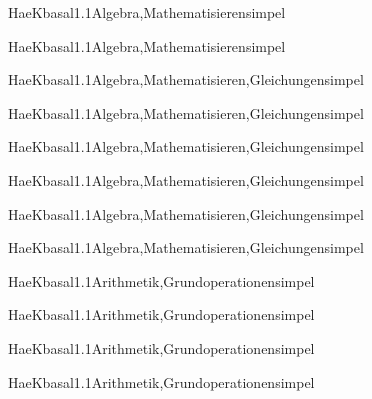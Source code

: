 \documentclass[12pt]{article}
\begin{document}
\begin{Add}{HaeK}{basal1.1}{Algebra,Mathematisieren}{simpel}
\solution{ }
\end{Add}
\begin{Add}{HaeK}{basal1.1}{Algebra,Mathematisieren}{simpel}
\end{Add}

\begin{Add}{HaeK}{basal1.1}{Algebra,Mathematisieren,Gleichungen}{simpel}
\solution{ }
\end{Add}
\begin{Add}{HaeK}{basal1.1}{Algebra,Mathematisieren,Gleichungen}{simpel}
\end{Add}

\begin{Add}{HaeK}{basal1.1}{Algebra,Mathematisieren,Gleichungen}{simpel}
\solution{ }
\end{Add}
\begin{Add}{HaeK}{basal1.1}{Algebra,Mathematisieren,Gleichungen}{simpel}
\end{Add}

\begin{Add}{HaeK}{basal1.1}{Algebra,Mathematisieren,Gleichungen}{simpel}
\solution{ }
\end{Add}
\begin{Add}{HaeK}{basal1.1}{Algebra,Mathematisieren,Gleichungen}{simpel}
\end{Add}

\begin{Add}{HaeK}{basal1.1}{Arithmetik,Grundoperationen}{simpel}
\solution{ }
\end{Add}
\begin{Add}{HaeK}{basal1.1}{Arithmetik,Grundoperationen}{simpel}
\end{Add}

\begin{Add}{HaeK}{basal1.1}{Arithmetik,Grundoperationen}{simpel}
\solution{ }
\end{Add}
\begin{Add}{HaeK}{basal1.1}{Arithmetik,Grundoperationen}{simpel}
\end{Add}
\end{document}
